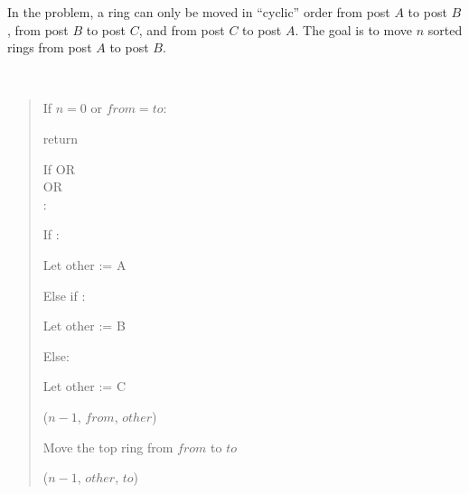 \documentclass[10pt]{article}
\begin{document}
In the  problem, a ring can only be moved in ``cyclic'' order from post $A$ to post $B$, from post $B$ to post $C$, and from post $C$ to post $A$. The goal is to move $n$ sorted rings from post $A$ to post $B$.

\begin{solution}\ %
\begin{quote}
\noindent{}%

%
\begin{steps}
  \item If $n = 0$ or $from = to$:
    \begin{steps}
    \item return
    \end{steps}

  \item If \big[$(from = A)$ AND $(to = B)$\big] OR \\
    \nf{\quad}\big[$(from = B)$ AND $(to = C)$\big] OR \\
    \nf{\quad}\big[$(from = C)$ AND $(to = A)$\big]: 
     \begin{steps}
      \item If :
        \begin{steps}
        \item Let other := A
        \end{steps}
      \item Else if :
        \begin{steps}
        \item Let other := B
        \end{steps}
      \item Else:
        \begin{steps}
        \item Let other := C
        \end{steps}
      \item {}($n - 1$, $from$, $other$)
      \item Move the top ring from $from$ to $to$
      \item {}($n - 1$, $other$, $to$)
      \end{steps}


\end{steps}
\end{quote}
\end{solution}
\end{document}
